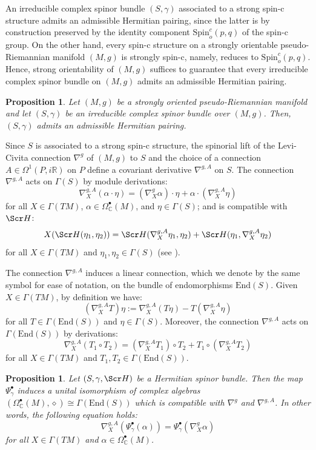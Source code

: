 \documentclass[10pt,a4paper,twoside,reqno]{amsart}
\theoremstyle{plain}
\newtheorem{prop}[thm]{Proposition}
\theoremstyle{definition}
\theoremstyle{remark}
\newcommand{\End}{\mathrm{End}}
\def\C{\mathbb{C}}
\def\R{\mathbb{R}}
\def\scS{\Scr H}
\def\Spin{\mathrm{Spin}}
\def\Spin{\mathrm{Spin}}
\def\R{\mathbb{R}}
\begin{document}
An irreducible complex spinor bundle $(S,\gamma)$ associated to a strong spin-c structure admits an admissible Hermitian pairing, since the latter is by construction preserved by the identity component $\Spin_o^c(p,q)$ of the spin-c group. On the other hand, every spin-c structure on a strongly orientable pseudo-Riemannian manifold $(M,g)$ is strongly spin-c, namely, reduces to $\Spin_o^c(p,q)$. Hence, strong orientability of $(M,g)$ suffices to guarantee that every irreducible complex spinor bundle on $(M,g)$ admits an admissible Hermitian pairing. 

\begin{prop}
\label{prop:Hermitianexistence}
Let $(M,g)$ be a strongly oriented pseudo-Riemannian manifold and let $(S,\gamma)$ be an irreducible complex spinor bundle over $(M,g)$. Then, $(S,\gamma)$ admits an admissible Hermitian pairing.
\end{prop}

Since $S$ is associated to a strong spin-c structure, the spinorial lift of the Levi-Civita connection $\nabla^g$ of $(M,g)$ to $S$ and the choice of a connection $A\in\Omega^1(P,i\R)$ on $P$ define a covariant derivative $\nabla^{g,A}$ on $S$. The connection $\nabla^{g,A}$ acts on $\Gamma(S)$ by module derivations: \begin{equation}\label{eq:nabla_on_alpha.eta}
    \nabla^{g,A}_X(\alpha\cdot\eta)=(\nabla^g_X\alpha)\cdot\eta+\alpha\cdot(\nabla^{g,A}_X\eta)
\end{equation} for all $X\in\Gamma(TM)$, $\alpha\in\Omega^{\bullet}_{\mathbb{C}}(M)$, and $\eta\in\Gamma(S)$; and is compatible with $\scS$: $$X(\scS(\eta_1,\eta_2))=\scS(\nabla^{g,A}_X\eta_1,\eta_2)+\scS(\eta_1,\nabla^{g,A}_X\eta_2)$$ for all $X\in\Gamma(TM)$ and $\eta_1,\eta_2\in\Gamma(S)$ (see \cite[Section 3.1]{Friedrich2000}).\medskip

The connection $\nabla^{g,A}$ induces a linear connection, which we denote by the same symbol for ease of notation, on the bundle of endomorphisms $\End(S)$. Given $X\in\Gamma(TM)$, by definition we have: $$(\nabla^{g,A}_XT)\eta:=\nabla^{g,A}_X(T\eta)-T(\nabla^{g,A}_X\eta)$$ for all $T\in\Gamma(\End(S))$ and $\eta\in\Gamma(S)$. Moreover, the connection $\nabla^{g,A}$ acts on $\Gamma(\End(S))$ by derivations: $$\nabla^{g,A}_X(T_1\circ T_2)=(\nabla^{g,A}_XT_1)\circ T_2+T_1\circ(\nabla^{g,A}_XT_2)$$ for all $X\in\Gamma(TM)$ and $T_1,T_2\in\Gamma(\End(S))$.

\begin{prop}
\label{prop:nabla_compatible_Psi_gamma}
Let $(S,\gamma,\scS)$ be a Hermitian spinor bundle. Then the map $\Psi^{\bullet}_\gamma$ induces a unital isomorphism of complex algebras $(\Omega^{\bullet}_\C(M),\diamond)\cong\Gamma(\End(S))$ which is compatible with $\nabla^g$ and $\nabla^{g,A}$. In other words, the following equation holds: $$\nabla^{g,A}_X(\Psi^{\bullet}_\gamma(\alpha))=\Psi^{\bullet}_\gamma(\nabla^g_X\alpha)$$ for all $X\in\Gamma(TM)$ and $\alpha\in\Omega^{\bullet}_\C(M)$.
\end{prop}
\end{document}
